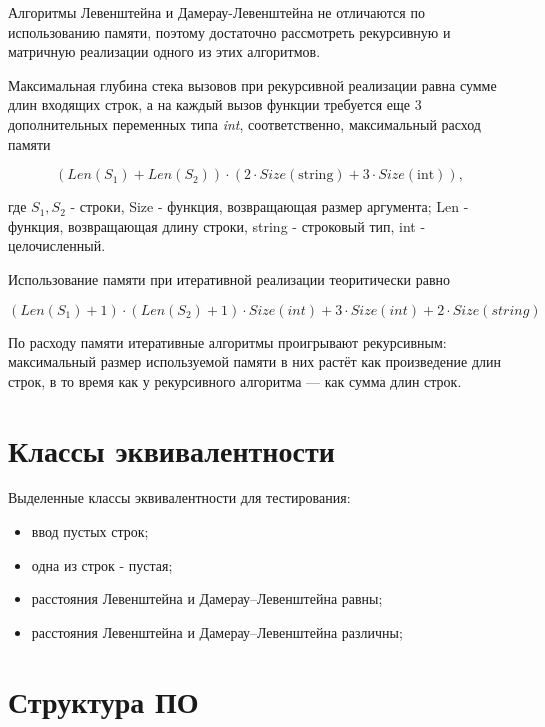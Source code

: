 \documentclass[a4paper,14pt, unknownkeysallowed]{extreport}
\begin{document}
Алгоритмы Левенштейна и Дамерау-Левенштейна не отличаются по использованию памяти, поэтому достаточно рассмотреть рекурсивную и матричную реализации одного из этих алгоритмов.

Максимальная глубина стека вызовов при рекурсивной реализации равна сумме длин входящих строк, а на каждый вызов функции требуется еще 3 дополнительных переменных типа \textit{int}, соответственно, максимальный расход памяти

\begin{equation}
	(Len(S_{1}) + Len(S_{2})) \cdot (2 \cdot Size(\text{string}) + 3 \cdot Size(\text{int})),
\end{equation}

\noindent
где $S_{1}, S_{2}$ - строки, Size - функция, возвращающая размер аргумента; Len - функция, возвращающая длину строки, string - строковый тип, int - целочисленный.

Использование памяти при итеративной реализации теоритически равно

\begin{equation}
	(Len(S_{1}) + 1) \cdot (Len(S_{2}) + 1) \cdot Size(int) + 3 \cdot Size(int) + 2 \cdot Size(string)
\end{equation}

По расходу памяти итеративные алгоритмы проигрывают рекурсивным: максимальный размер используемой памяти в них растёт как произведение длин строк, в то время как у рекурсивного алгоритма — как сумма длин строк.

\clearpage

\section{Классы эквивалентности}

Выделенные классы эквивалентности для тестирования:

\begin{itemize}
	\item ввод пустых строк;
	\item одна из строк - пустая;
	\item расстояния Левенштейна и Дамерау–Левенштейна равны;
	\item расстояния Левенштейна и Дамерау–Левенштейна различны;
\end{itemize}

\section{Структура ПО}
\end{document}
